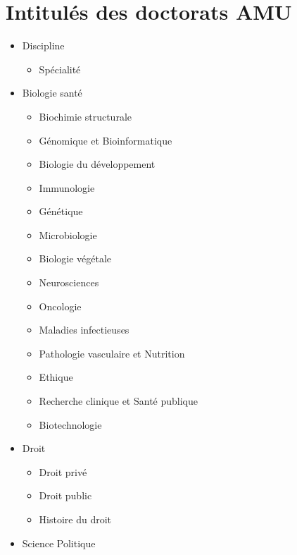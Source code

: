 \chapter{Intitulés des doctorats AMU}
\label{chap:doctorats}

		\begin{itemize}
		\item Discipline
			\begin{itemize}
			\item Spécialité
			\end{itemize}
		\end{itemize}
		
	\label{ed-62-sciences-de-la-vie-et-de-la-sante}

		\begin{itemize}
		\item Biologie santé
			\begin{itemize}
			\item Biochimie structurale
			\item Génomique et Bioinformatique
			\item Biologie du développement
			\item Immunologie
			\item Génétique
			\item Microbiologie
			\item Biologie végétale
			\item Neurosciences
			\item Oncologie
			\item Maladies infectieuses
			\item Pathologie vasculaire et Nutrition
			\item Ethique
			\item Recherche clinique et Santé publique
			\item Biotechnologie
			\end{itemize}
		\end{itemize}

	\label{ed-67-sciences-juridiques-et-politiques}

		\begin{itemize}
		\item Droit
			\begin{itemize}
			\item Droit privé
			\item Droit public
			\item Histoire du droit
			\end{itemize}
		\item Science Politique
		\end{itemize}

